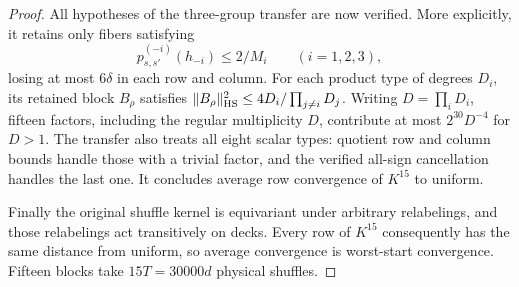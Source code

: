 \begin{proof}
All hypotheses of the three-group transfer are now verified. More
explicitly, it retains only fibers satisfying
\[
 p^{(-i)}_{s,s'}(h_{-i})\le2/M_i\qquad(i=1,2,3),
\]
losing at most $6\delta$ in each row and column. For each product
type of degrees $D_i$, its retained block $B_\rho$ satisfies
$\|B_\rho\|_{\mathrm{HS}}^2\le4D_i/\prod_{j\ne i}D_j$.
Writing $D=\prod_iD_i$, fifteen factors, including the regular
multiplicity $D$, contribute at most $2^{30}D^{-4}$ for $D>1$.
The transfer also treats all eight scalar types: quotient row and
column bounds handle those with a trivial factor, and the verified
all-sign cancellation handles the last one. It concludes average
row convergence of $K^{15}$ to uniform.

Finally the original shuffle kernel is equivariant under arbitrary
relabelings, and those relabelings act transitively on decks. Every
row of $K^{15}$ consequently has the same distance from uniform,
so average convergence is worst-start convergence. Fifteen blocks
take $15T=30000d$ physical shuffles.
\end{proof}

